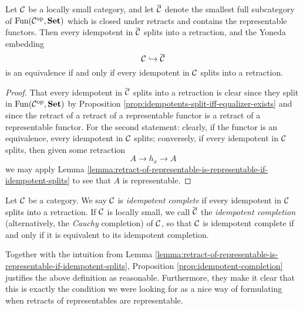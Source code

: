 \begin{proposition}\label{prop:idempotent-completion}
	Let \(\mathcal{C}\) be a locally small category, and let \(\overline{\mathcal{C}}\) denote the smallest full subcategory of \(\operatorname{Fun}(\mathcal{C}^{\mathrm{op}},\mathbf{Set})\) which is closed under retracts and contains the representable functors.
	Then every idempotent in \(\overline{\mathcal{C}}\) splits into a retraction, and the Yoneda embedding
	\[ \mathcal{C}\hookrightarrow\overline{\mathcal{C}} \]
	is an equivalence if and only if every idempotent in \(\mathcal{C}\) splits into a retraction.
\end{proposition}
\begin{proof}
That every idempotent in \(\overline{\mathcal{C}}\) splits into a retraction is clear since they split in \(\operatorname{Fun}(\mathcal{C}^{\mathrm{op}},\mathbf{Set})\) by Proposition \ref{prop:idempotents-split-iff-equalizer-exists} and since
the retract of a retract of a representable functor is a retract of a representable functor. For the second statement: clearly, if the functor is an equivalence, every idempotent in \(\mathcal{C}\) splits;
conversely, if every idempotent in \(\mathcal{C}\) splits, then given some retraction
\[ A \to h_x \to A \]
we may apply Lemma \ref{lemma:retract-of-representable-is-representable-if-idempotent-splits} to see that \(A\) is representable.
\end{proof}

\begin{definition}
	Let \(\mathcal{C}\) be a category. We say \(\mathcal{C}\) is \emph{idempotent complete} if every idempotent in \(\mathcal{C}\) splits into a retraction. If \(\mathcal{C}\) is locally small, we call
	\(\overline{\mathcal{C}}\) the \emph{idempotent completion} (alternatively, the \emph{Cauchy} completion) of \(\mathcal{C}\), so that \(\mathcal{C}\) is idempotent complete if and only if it is equivalent to its
	idempotent completion.
\end{definition}

Together with the intuition from Lemma \ref{lemma:retract-of-representable-is-representable-if-idempotent-splits}, Proposition \ref{prop:idempotent-completion} justifies the above definition as reasonable.
Furthermore, they make it clear that this is exactly the condition we were looking for as a nice way of formulating when retracts of representables are representable.

